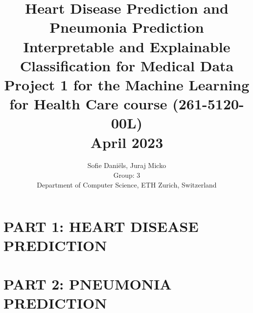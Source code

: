 \documentclass[10pt,conference,compsocconf]{IEEEtran}
\title{Heart Disease Prediction and Pneumonia Prediction \\
\large Interpretable and Explainable Classification for Medical Data \\
\normalsize Project 1 for the Machine Learning for Health Care course (261-5120-00L) \\ \vspace*{20pt}
April 2023
}
\author{
  Sofie Daniëls, Juraj Micko\\
  Group: 3 \\
  Department of Computer Science, ETH Zurich, Switzerland
}
\begin{document}
\maketitle
\thispagestyle{plain}
\pagestyle{plain}




\section*{\large PART 1: HEART DISEASE PREDICTION}






\clearpage

\setcounter{section}{0}
\section*{\large PART 2: PNEUMONIA PREDICTION}








\printbibliography[heading=references]
\end{document}

